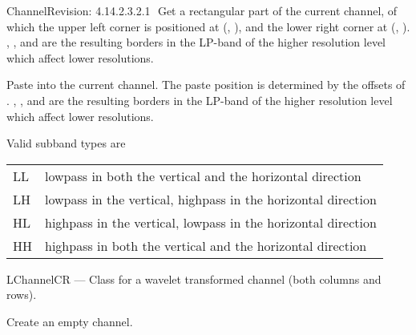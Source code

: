\begin{manpage}{\libtitle}{Channel}{$ $Revision: 4.14.2.3.2.1 $ $}
    Get a rectangular part of the current channel, of which the upper left
    corner is positioned at (, ), and the lower right corner
    at (, ). , ,  and
     are the resulting borders in the LP-band of the higher
    resolution level which affect lower resolutions.

    Paste  into the current channel. The paste position is
    determined by the offsets of . , ,
     and  are the resulting borders in the LP-band of
    the higher resolution level which affect lower resolutions.


\subtitle{Subband \\ Types}
    Valid subband types are
    \begin{center}\begin{tabular}{|l|l|}
    \hline
    LL & lowpass in both the vertical and the horizontal direction \\
    LH & lowpass in the vertical, highpass in the horizontal direction \\
    HL & highpass in the vertical, lowpass in the horizontal direction \\
    HH & highpass in both the vertical and the horizontal direction \\
    \hline
    \end{tabular}\end{center}


\separator

\subtitle{Name}
    LChannelCR --- Class for a wavelet transformed channel (both columns and
		   rows).


\subtitle{Declaration}

    Create an empty channel.


\end{manpage}
